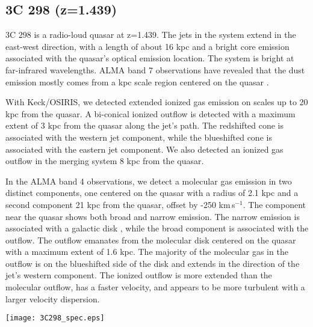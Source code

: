 \documentclass[twocolumn]{aastex63}
\newcommand{\kms}{km\,s$^{-1}$}
\begin{document}
\subsection{3C 298 (z=1.439)}\label{sec:3C298}

3C 298 is a radio-loud quasar at z=1.439. The jets in the system extend in the east-west direction, with a length of about 16 kpc and a bright core emission associated with the quasar's optical emission location. The system is bright at far-infrared wavelengths. ALMA band 7 observations have revealed that the dust emission mostly comes from a kpc scale region centered on the quasar \citep{Barthel18}.

With Keck/OSIRIS, we detected extended ionized gas emission \citep{Vayner19b} on scales up to 20 kpc from the quasar. A bi-conical ionized outflow is detected with a maximum extent of 3 kpc from the quasar along the jet's path. The redshifted cone is associated with the western jet component, while the blueshifted cone is associated with the eastern jet component. We also detected an ionized gas outflow in the merging system 8 kpc from the quasar.

In the ALMA band 4 observations, we detect a molecular gas emission in two distinct components, one centered on the quasar with a radius of 2.1 kpc and a second component 21 kpc from the quasar, offset by -250 \kms. The component near the quasar shows both broad and narrow emission. The narrow emission is associated with a galactic disk \citep{Vayner17}, while the broad component is associated with the outflow. The outflow emanates from the molecular disk centered on the quasar with a maximum extent of 1.6 kpc. The majority of the molecular gas in the outflow is on the blueshifted side of the disk and extends in the direction of the jet's western component. The ionized outflow is more extended than the molecular outflow, has a faster velocity, and appears to be more turbulent with a larger velocity dispersion. 



\begin{figure*}[!th]
    \centering
    \texttt{[image: 3C298\_spec.eps]}
    \caption{ALMA band 4 observations of 3C 298. On the left we show optimally extracted intensity map of CO emission in the 3C 298 system, detected in our 2017 study of this object \citep{Vayner17}. The purple contours outline the molecular outflow region, white contours outline total emission from the molecular disk, while the teal contours outline a star forming/tidal tail feature. On the right we show a spectrum integrated over each distinct region along with fit to the CO (3-2) emission line. Dashed lines represent the individual Gaussian components of the emission line fit, while the solid black line represents the sum of all components and a 0th order polynomial fit to any residual continuum. The systemic redshift of the quasar host galaxy is at 0 \kms. The ellipse in the lower left corner on the right panel represents the beam of the ALMA band 4 observations.}
    \label{fig:3C298_spec}
\end{figure*}
\end{document}
